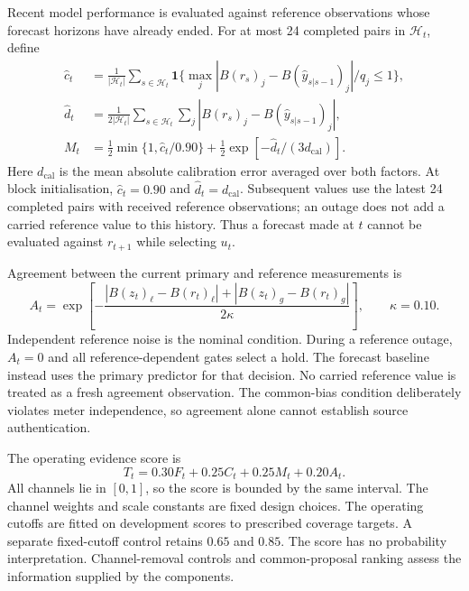 \documentclass[preprint,12pt]{elsarticle}
\newcommand{\ind}{\mathbf{1}}
\begin{document}
Recent model performance is evaluated against reference observations whose forecast horizons have already ended. For at most 24 completed pairs in $\mathcal H_t$, define
\begin{align}
\widehat c_t&=\frac{1}{|\mathcal H_t|}\sum_{s\in\mathcal H_t}
\ind\{\max_j|B(r_s)_j-B(\widehat y_{s|s-1})_j|/q_j\leq1\},\label{eq:recentcoverage}\\
\widehat d_t&=\frac{1}{2|\mathcal H_t|}\sum_{s\in\mathcal H_t}\sum_j
|B(r_s)_j-B(\widehat y_{s|s-1})_j|,\label{eq:recentmae}\\
M_t&=\frac{1}{2}\min\{1,\widehat c_t/0.90\}
+\frac{1}{2}\exp[-\widehat d_t/(3d_{\mathrm{cal}})].\label{eq:maturity}
\end{align}
Here $d_{\mathrm{cal}}$ is the mean absolute calibration error averaged over both factors. At block initialisation, $\widehat c_t=0.90$ and $\widehat d_t=d_{\mathrm{cal}}$. Subsequent values use the latest 24 completed pairs with received reference observations; an outage does not add a carried reference value to this history. Thus a forecast made at $t$ cannot be evaluated against $r_{t+1}$ while selecting $u_t$.

Agreement between the current primary and reference measurements is
\begin{equation}
A_t=\exp\left[-\frac{|B(z_t)_\ell-B(r_t)_\ell|+|B(z_t)_g-B(r_t)_g|}{2\kappa}\right],\qquad\kappa=0.10.
\label{eq:agreement}
\end{equation}
Independent reference noise is the nominal condition. During a reference outage, $A_t=0$ and all reference-dependent gates select a hold. The forecast baseline instead uses the primary predictor for that decision. No carried reference value is treated as a fresh agreement observation. The common-bias condition deliberately violates meter independence, so agreement alone cannot establish source authentication.

The operating evidence score is
\begin{equation}
T_t=0.30F_t+0.25C_t+0.25M_t+0.20A_t.\label{eq:trust}
\end{equation}
All channels lie in $[0,1]$, so the score is bounded by the same interval. The channel weights and scale constants are fixed design choices. The operating cutoffs are fitted on development scores to prescribed coverage targets. A separate fixed-cutoff control retains $0.65$ and $0.85$. The score has no probability interpretation. Channel-removal controls and common-proposal ranking assess the information supplied by the components.
\end{document}
